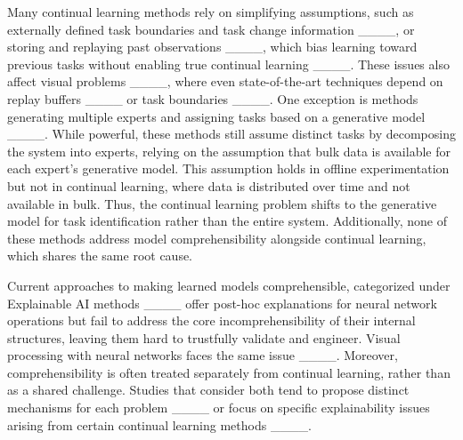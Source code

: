 Many continual learning methods rely on simplifying assumptions, such as externally defined task boundaries and task change information ____, or storing and replaying past observations ____, which bias learning toward previous tasks without enabling true continual learning ____. These issues also affect visual problems ____, where even state-of-the-art techniques depend on replay buffers ____ or task boundaries ____. One exception is methods generating multiple experts and assigning tasks based on a generative model ____. While powerful, these methods still assume distinct tasks by decomposing the system into experts, relying on the assumption that bulk data is available for each expert’s generative model. This assumption holds in offline experimentation but not in continual learning, where data is distributed over time and not available in bulk. Thus, the continual learning problem shifts to the generative model for task identification rather than the entire system. Additionally, none of these methods address model comprehensibility alongside continual learning, which shares the same root cause.







Current approaches to making learned models comprehensible, categorized under Explainable AI methods ____ offer post-hoc explanations for neural network operations but fail to address the core incomprehensibility of their internal structures, leaving them hard to trustfully validate and engineer. Visual processing with neural networks faces the same issue ____. Moreover, comprehensibility is often treated separately from continual learning, rather than as a shared challenge. Studies that consider both tend to propose distinct mechanisms for each problem ____ or focus on specific explainability issues arising from certain continual learning methods ____.



